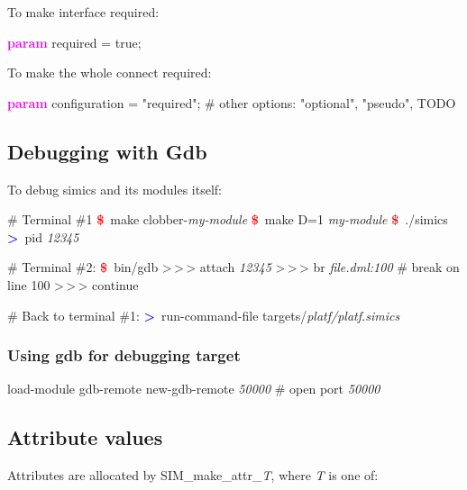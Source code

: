 \documentclass[8pt]{extarticle}
\newenvironment{code}[1][]{%
\begin{prebox}[#1]\obeylines}{%
\end{prebox}}
\newcommand{\cod}[1]{\colorbox{green!15}{#1}}
\newcommand{\ind}{\hphantom{~~~}}
\newcommand{\prompt}{\textcolor{red}{\textbf{\$}\ }}
\newcommand{\sprompt}{\textcolor{blue}{\textbf{>}\ }}
\newcommand{\kw}[1]{\textcolor{magenta}{\textbf{#1}}}
\newcommand{\p}[1]{\textit{\large#1}}
\begin{document}
\begin{multicols*}{3}
    To make interface required:
        \begin{code}
            \kw{param} required = true;
        \end{code}
    To make the whole \cod{connect} required:
        \begin{code}
            \kw{param} configuration = "required";
            \# other options: "optional", "pseudo", TODO
        \end{code}

\subsection{Debugging with Gdb}
To debug simics and its modules itself:
        \begin{code}
            \# Terminal \#1
            \prompt make clobber-\p{my-module}
            \prompt make D=1 \p{my-module}
            \prompt ./simics
            \sprompt pid
            \p{12345}
        \end{code}

        \begin{code}[colback=blue!15]
            \# Terminal \#2:
            \prompt bin/gdb
            >\,>\,> attach \p{12345}
            >\,>\,> br \p{file.dml:100}  \ind \# break on line 100
            >\,>\,> continue
        \end{code}

        \begin{code}
            \# Back to terminal \#1:
            \sprompt run-command-file targets/\p{platf/platf.simics}
        \end{code}


\subsubsection{Using gdb for debugging target}
\begin{code}
    load-module gdb-remote
    new-gdb-remote \p{50000}  \ind \# open port \p{50000}
\end{code}


\subsection{Attribute values}

    Attributes are allocated by \cod{SIM\_make\_attr\_\p{T}}, where
    \p{T} is one of:


\end{multicols*}
\end{document}
